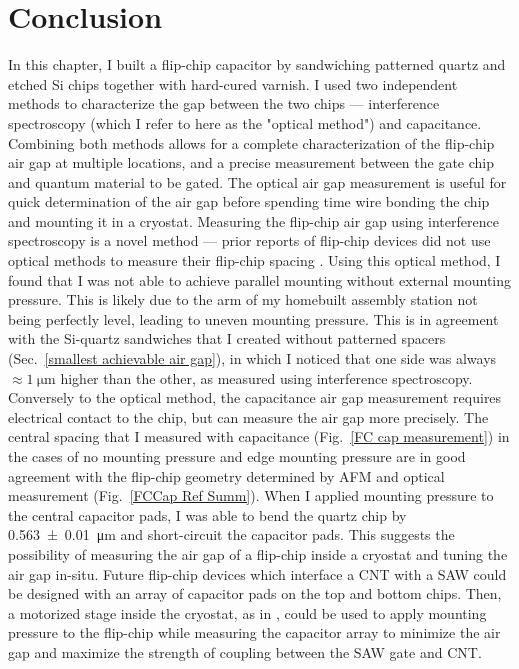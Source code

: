 \documentclass{beavtex_dub_edit}
\begin{document}
\section{Conclusion}
In this chapter, I built a flip-chip capacitor by sandwiching patterned quartz and etched Si chips together with hard-cured varnish. I used two independent methods to characterize the gap between the two chips — interference spectroscopy (which I refer to here as the "optical method") and capacitance. Combining both methods allows for a complete characterization of the flip-chip air gap at multiple locations, and a precise measurement between the gate chip and quantum material to be gated. The optical air gap measurement is useful for quick determination of the air gap before spending time wire bonding the chip and mounting it in a cryostat. Measuring the flip-chip air gap using interference spectroscopy is a novel method — prior reports of flip-chip devices did not use optical methods to measure their flip-chip spacing \cite{beukman_noninvasive_2015, chu_creation_2018,satzinger_quantum_2018,bennaceur_mechanical_2015}. Using this optical method, I found that I was not able to achieve parallel mounting without external mounting pressure. This is likely due to the arm of my homebuilt assembly station not being perfectly level, leading to uneven mounting pressure. This is in agreement with the Si-quartz sandwiches that I created without patterned spacers (Sec.\ \ref{smallest achievable air gap}), in which I noticed that one side was always $\approx \SI{1}{\micro\meter}$ higher than the other, as measured using interference spectroscopy. Conversely to the optical method, the capacitance air gap measurement requires electrical contact to the chip, but can measure the air gap more precisely. The central spacing that I measured with capacitance (Fig.\ \ref{FC cap measurement}) in the cases of no mounting pressure and edge mounting pressure are in good agreement with the flip-chip geometry determined by AFM and optical measurement (Fig.\ \ref{FCCap Ref Summ}). When I applied mounting pressure to the central capacitor pads, I was able to bend the quartz chip by \SI{0.563(10)}{\micro\meter} and short-circuit the capacitor pads. This suggests the possibility of measuring the air gap of a flip-chip inside a cryostat and tuning the air gap in-situ. Future flip-chip devices which interface a CNT with a SAW could be designed with an array of capacitor pads on the top and bottom chips. Then, a motorized stage inside the cryostat, as in \cite{inbar_quantum_2023}, could be used to apply mounting pressure to the flip-chip while measuring the capacitor array to minimize the air gap and maximize the strength of coupling between the SAW gate and CNT. 
\end{document}
